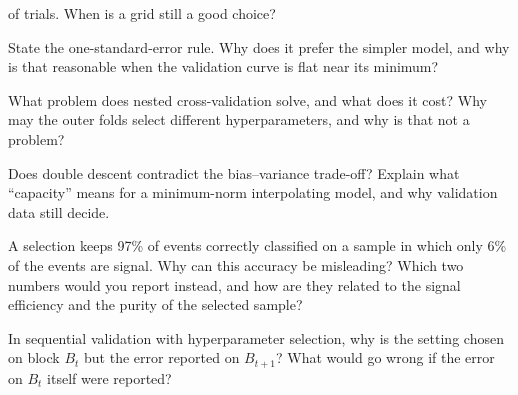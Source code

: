 \documentclass[11pt]{article}
\begin{document}
\begin{questions}
\begin{conceptual}
of trials. When is a grid still a good choice?
\item State the one-standard-error rule. Why does it prefer the simpler model, and why is that reasonable when the
validation curve is flat near its minimum?
\item What problem does nested cross-validation solve, and what does it cost? Why may the outer folds select
different hyperparameters, and why is that not a problem?
\item Does double descent contradict the bias--variance trade-off? Explain what ``capacity'' means for a
minimum-norm interpolating model, and why validation data still decide.
\item A selection keeps 97\% of events correctly classified on a sample in which only 6\% of the events are signal.
Why can this accuracy be misleading? Which two numbers would you report instead, and how are they related to the
signal efficiency and the purity of the selected sample?
\item In sequential validation with hyperparameter selection, why is the setting chosen on block $B_t$ but the error
reported on $B_{t+1}$? What would go wrong if the error on $B_t$ itself were reported?
\end{conceptual}


\end{questions}
\end{document}
